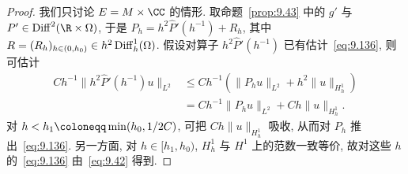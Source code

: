 \begin{proof}
我们只讨论 $E = M \times \CC$ 的情形. 取命题~\ref{prop:9.43} 中的 $g'$ 与 $P' \in \Diff^2(\R \times \Omega)$, 于是 $P_h = h^2 \widehat{P}'(h^{-1}) + R_h$, 其中 $R = (R_h)_{h \in (0, h_0)} \in h^2 \operatorname{Diff}_h^1(\Omega)$. 假设对算子 $h^2 \widehat{P}'(h^{-1})$ 已有估计~\eqref{eq:9.136}, 则可估计
\begin{equation}\label{eq:9.138}
    \begin{aligned}
        C h^{-1} \|h^2 \widehat{P}'(h^{-1}) u\|_{L^2} &\le C h^{-1} \left( \|P_h u\|_{L^2} + h^2 \|u\|_{H_h^1} \right) \\
        &= C h^{-1} \|P_h u\|_{L^2} + Ch \|u\|_{H_h^1}.
    \end{aligned}
\end{equation}
对 $h < h_1 \defeq \min(h_0, 1/2C)$, 可把 $Ch\|u\|_{H_h^1}$ 吸收, 从而对 $P_h$ 推出~\eqref{eq:9.136}. 另一方面, 对 $h \in [h_1, h_0)$, $H_h^1$ 与 $H^1$ 上的范数一致等价, 故对这些 $h$ 的~\eqref{eq:9.136} 由~\eqref{eq:9.42} 得到.


\end{proof}
